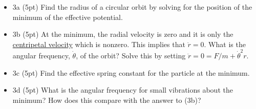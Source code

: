 \documentclass[%
oneside,                 %
final,                   %
10pt]{article}
\begin{document}
\begin{itemize}
\item 3a (5pt)  Find the radius of a circular orbit by solving for the position of the minimum of the effective potential. 

\item 3b (5pt) At the minimum, the radial velocity is zero and it is only the \href{{https://en.wikipedia.org/wiki/Centripetal_force}}{centripetal velocity} which is nonzero. This implies that $\ddot{r}=0$.  What is the angular frequency, $\dot{\theta}$, of the orbit? Solve this by setting $\ddot{r}=0=F/m+\dot{\theta}^2r$.

\item 3c (5pt) Find the effective spring constant for the particle at the minimum.

\item 3d (5pt) What is the angular frequency for small vibrations about the minimum? How does this compare with the answer to (3b)?
\end{itemize}

\noindent

\end{document}
